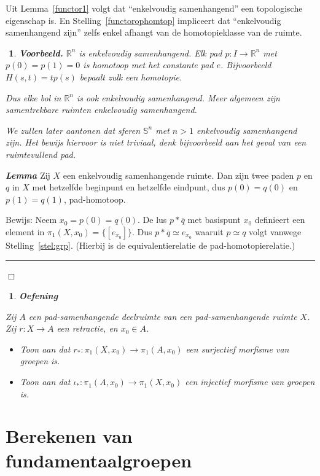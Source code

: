 \documentclass[12pt]{book}
\newcommand{\R}{\mathbb{R}}
\newcommand{\Sf}{\mathbb{S}}
\newcommand{\bew}{{\sc Bewijs: }}
\newcommand{\B}{\rule{1mm}{0mm} \hfill $\Box$ }
\newenvironment{lem}{\begin{lemh}{\em {\bf Lemma }}}{\end{lemh}}
\newtheorem{vbh}[stelh]{$\!\!$}
\newenvironment{vb}{\begin{vbh} \em {\bf Voorbeeld.} }{\end{vbh}}
\newtheorem{eoef}{$\!\!$}[chapter]
\newenvironment{oef}{\begin{eoef} {\bf Oefening}}{\end{eoef}}
\begin{document}
Uit Lemma~\ref{functor1} volgt dat ``enkelvoudig samenhangend'' een topologische eigenschap is.
En Stelling~\ref{functorophomtop} impliceert dat ``enkelvoudig samenhangend zijn'' zelfs enkel afhangt van de homotopieklasse van de ruimte.

\begin{vb} $\R^n$ is enkelvoudig samenhangend. Elk pad $p:I\to \R^n$ met $p(0)=p(1)=0$ is
homotoop met het constante pad $e$. Bijvoorbeeld $H(s,t)=tp(s)$ bepaalt zulk een homotopie.

Dus elke bol in $\R^n$ is ook enkelvoudig samenhangend. Meer algemeen zijn samentrekbare ruimten enkelvoudig samenhangend.

We zullen later aantonen dat sferen $\Sf^n$ met $n >1$ enkelvoudig samenhangend zijn. Het bewijs hiervoor is niet triviaal, denk bijvoorbeeld aan het geval van een ruimtevullend pad.
\end{vb}

\begin{lem} \label{lusinenkelvs} Zij $X$ een enkelvoudig samenhangende ruimte. Dan zijn twee paden $p$ en $q$ in $X$ met hetzelfde beginpunt en hetzelfde eindpunt, dus $p(0)=q(0)$ en $p(1)=q(1)$, pad-homotoop. 
\end{lem}
\bew Neem $x_0=p(0)=q(0)$. De lus $p*\overline{q}$ met basispunt $x_0$ definieert een element in $\pi_1(X, x_0)=\{[e_{x_{0}}]\}$. Dus $p*\overline{q}\simeq e_{x_{0}}$ waaruit $p\simeq q$
volgt vanwege Stelling~\ref{stel:grp}. (Hierbij is de equivalentierelatie de pad-homotopierelatie.)\B


\begin{oef}

Zij $A$ een pad-samenhangende deelruimte van een pad-samenhangende 
ruimte $X$. Zij $r :X\rightarrow A$ een retractie, en $x_0\in A$.

\begin{itemize}
\item
Toon aan dat $r_* : \pi_1 (X, x_0 )  \rightarrow \pi_1 (A, x_0 )$ een surjectief morfisme van groepen is.
\item
Toon aan dat $\iota_* : \pi_1 (A, x_0 )  \rightarrow \pi_1 (X, x_0 )$ een injectief morfisme van groepen is.
\end{itemize}
\end{oef}

\section{Berekenen van fundamentaalgroepen}
\end{document}
